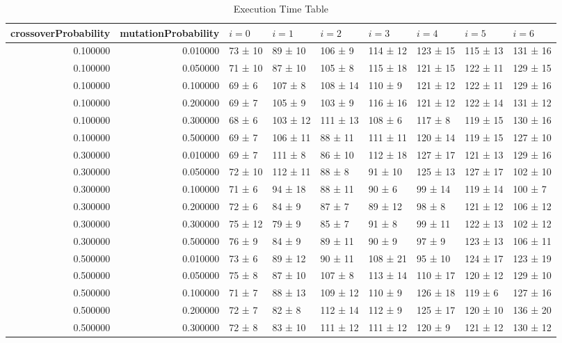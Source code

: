 \begin{table}
\caption{Execution Time Table}
\label{tab:exec_time_table}
\begin{tabular}{rrlllllll}
\toprule
crossoverProbability & mutationProbability & \(i = 0\) & \(i = 1\) & \(i = 2\) & \(i = 3\) & \(i = 4\) & \(i = 5\) & \(i = 6\) \\
\midrule
0.100000 & 0.010000 & 73 ± 10 & 89 ± 10 & 106 ± 9 & 114 ± 12 & 123 ± 15 & 115 ± 13 & 131 ± 16 \\
0.100000 & 0.050000 & 71 ± 10 & 87 ± 10 & 105 ± 8 & 115 ± 18 & 121 ± 15 & 122 ± 11 & 129 ± 15 \\
0.100000 & 0.100000 & 69 ± 6 & 107 ± 8 & 108 ± 14 & 110 ± 9 & 121 ± 12 & 122 ± 11 & 129 ± 16 \\
0.100000 & 0.200000 & 69 ± 7 & 105 ± 9 & 103 ± 9 & 116 ± 16 & 121 ± 12 & 122 ± 14 & 131 ± 12 \\
0.100000 & 0.300000 & 68 ± 6 & 103 ± 12 & 111 ± 13 & 108 ± 6 & 117 ± 8 & 119 ± 15 & 130 ± 16 \\
0.100000 & 0.500000 & 69 ± 7 & 106 ± 11 & 88 ± 11 & 111 ± 11 & 120 ± 14 & 119 ± 15 & 127 ± 10 \\
0.300000 & 0.010000 & 69 ± 7 & 111 ± 8 & 86 ± 10 & 112 ± 18 & 127 ± 17 & 121 ± 13 & 129 ± 16 \\
0.300000 & 0.050000 & 72 ± 10 & 112 ± 11 & 88 ± 8 & 91 ± 10 & 125 ± 13 & 127 ± 17 & 102 ± 10 \\
0.300000 & 0.100000 & 71 ± 6 & 94 ± 18 & 88 ± 11 & 90 ± 6 & 99 ± 14 & 119 ± 14 & 100 ± 7 \\
0.300000 & 0.200000 & 72 ± 6 & 84 ± 9 & 87 ± 7 & 89 ± 12 & 98 ± 8 & 121 ± 12 & 106 ± 12 \\
0.300000 & 0.300000 & 75 ± 12 & 79 ± 9 & 85 ± 7 & 91 ± 8 & 99 ± 11 & 122 ± 13 & 102 ± 12 \\
0.300000 & 0.500000 & 76 ± 9 & 84 ± 9 & 89 ± 11 & 90 ± 9 & 97 ± 9 & 123 ± 13 & 106 ± 11 \\
0.500000 & 0.010000 & 73 ± 6 & 89 ± 12 & 90 ± 11 & 108 ± 21 & 95 ± 10 & 124 ± 17 & 123 ± 19 \\
0.500000 & 0.050000 & 75 ± 8 & 87 ± 10 & 107 ± 8 & 113 ± 14 & 110 ± 17 & 120 ± 12 & 129 ± 10 \\
0.500000 & 0.100000 & 71 ± 7 & 88 ± 13 & 109 ± 12 & 110 ± 9 & 126 ± 18 & 119 ± 6 & 127 ± 16 \\
0.500000 & 0.200000 & 72 ± 7 & 82 ± 8 & 112 ± 14 & 112 ± 9 & 125 ± 17 & 120 ± 10 & 136 ± 20 \\
0.500000 & 0.300000 & 72 ± 8 & 83 ± 10 & 111 ± 12 & 111 ± 12 & 120 ± 9 & 121 ± 12 & 130 ± 12 \\

\end{tabular}
\end{table}
